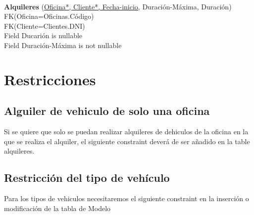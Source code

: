 \documentclass[a4paper,10pt]{article}
\newcommand\tab[1][1cm]{\hspace*{#1}}
\begin{document}
\paragraph{}
{\bf Alquileres} (\underline{Oficina*, Cliente*, Fecha-inicio}, Duración-Máxima, Duración)\\
  \tab FK(Oficina=Oficinas.Código)\\
  \tab FK(Cliente=Clientes.DNI)\\
  \tab Field Ducarión is nullable\\
  \tab Field Duración-Máxima is not nullable
\pagebreak

\section{Restricciones}
\subsection{Alguiler de vehiculo de solo una oficina}
Si se quiere que solo se puedan realizar alquileres de dehiculos de la oficina en la que se realiza el alquiler, el siguiente constraint deverá de ser añadido en la table alquileres.
\begin{scriptsize}
  
\end{scriptsize}

\subsection{Restricción del tipo de vehículo}
Para los tipos de vehiculos necesitaremos el siguiente constraint en la inserción o modificación de la tabla de Modelo
\begin{scriptsize}
  
\end{scriptsize}
\end{document}
